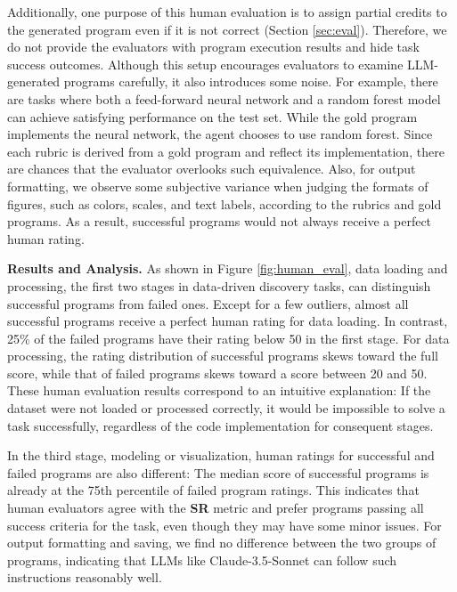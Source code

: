 \documentclass{article} %
\begin{document}
%
Additionally, one purpose of this human evaluation is to assign partial credits to the generated program even if it is not correct (Section \ref{sec:eval}). 
Therefore, we do not provide the evaluators with program execution results and hide task success outcomes.
Although this setup encourages evaluators to examine LLM-generated programs carefully, it also introduces some noise.
For example, there are tasks where both a feed-forward neural network and a random forest model can achieve satisfying performance on the test set.
While the gold program implements the neural network, the agent chooses to use random forest.
Since each rubric is derived from a gold program and reflect its implementation, there are chances that the evaluator overlooks such equivalence.
Also, for output formatting, we observe some subjective variance when judging the formats of figures, such as colors, scales, and text labels, according to the rubrics and gold programs.
As a result, successful programs would not always receive a perfect human rating.
%



%
\textbf{Results and Analysis.} 
As shown in Figure \ref{fig:human_eval}, data loading and processing, the first two stages in data-driven discovery tasks, can distinguish successful programs from failed ones.
Except for a few outliers, almost all successful programs receive a perfect human rating for data loading.
In contrast, 25\% of the failed programs have their rating below 50 in the first stage.
For data processing, the rating distribution of successful programs skews toward the full score, while that of failed programs skews toward a score between 20 and 50.
These human evaluation results correspond to an intuitive explanation:
If the dataset were not loaded or processed correctly, it would be impossible to solve a task successfully, regardless of the code implementation for consequent stages. 
%

%
In the third stage, modeling or visualization, human ratings for successful and failed programs are also different:
The median score of successful programs is already at the 75th percentile of failed program ratings.
This indicates that human evaluators agree with the \textbf{SR} metric and prefer programs passing all success criteria for the task, even though they may have some minor issues.
For output formatting and saving, we find no difference between the two groups of programs, indicating that LLMs like Claude-3.5-Sonnet can follow such instructions reasonably well.
%
\end{document}
